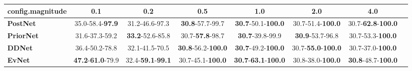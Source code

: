 \begin{tabular}{lccccccc}
\toprule
\textbf{config.magnitude} &                               0.1 &                               0.2 &                                0.5 &                                         1.0 &                                2.0 &                                4.0 \\
\midrule
\textbf{PostNet } &           35.0-58.4-\textbf{97.9} &                    31.2-46.6-97.3 &            \textbf{30.8}-57.7-99.7 &           \textbf{30.7}-50.1-\textbf{100.0} &           30.7-51.4-\textbf{100.0} &  30.7-\textbf{62.8}-\textbf{100.0} \\
\textbf{PriorNet} &                    31.6-37.3-59.2 &           \textbf{33.2}-52.6-85.8 &            30.7-\textbf{57.8}-98.7 &                     \textbf{30.7}-39.8-99.9 &            \textbf{30.9}-53.7-96.8 &           30.7-53.3-\textbf{100.0} \\
\textbf{DDNet   } &                    36.4-50.2-78.8 &                    32.1-41.5-70.5 &  \textbf{30.8}-56.2-\textbf{100.0} &           \textbf{30.7}-49.2-\textbf{100.0} &  30.7-\textbf{55.0}-\textbf{100.0} &           30.7-37.0-\textbf{100.0} \\
\textbf{EvNet   } &  \textbf{47.2}-\textbf{61.0}-79.9 &  32.4-\textbf{59.1}-\textbf{99.1} &           30.7-45.1-\textbf{100.0} &  \textbf{30.7}-\textbf{63.1}-\textbf{100.0} &           30.8-38.0-\textbf{100.0} &  \textbf{30.8}-48.7-\textbf{100.0} \\
\bottomrule
\end{tabular}
